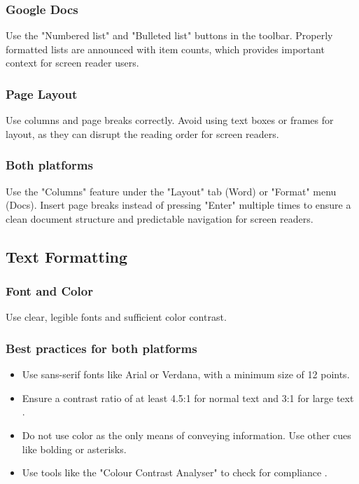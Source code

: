 \subsubsection{Google Docs}\label{ch15:sssec:docs-lists}
Use the "Numbered list" and "Bulleted list" buttons in the toolbar. Properly formatted lists are announced with item counts, which provides important context for screen reader users.

\subsubsection{Page Layout}\label{ch15:sssec:page-layout}
Use columns and page breaks correctly. Avoid using text boxes or frames for layout, as they can disrupt the reading order for screen readers.

\subsubsection{Both platforms}\label{ch15:sssec:layout-both}
Use the "Columns" feature under the "Layout" tab (Word) or "Format" menu (Docs). Insert page breaks instead of pressing "Enter" multiple times to ensure a clean document structure and predictable navigation for screen readers.

\subsection{Text Formatting}\label{ch15:ssec:text-formatting}

\subsubsection{Font and Color}\label{ch15:sssec:font-color}
Use clear, legible fonts and sufficient color contrast.

\subsubsection{Best practices for both platforms}\label{ch15:sssec:font-color-both}
\begin{itemize}
	\item Use sans-serif fonts like Arial or Verdana, with a minimum size of 12 points.
	\item Ensure a contrast ratio of at least 4.5:1 for normal text and 3:1 for large text \supercite{WCAG2018}.
	\item Do not use color as the only means of conveying information. Use other cues like bolding or asterisks.
	\item Use tools like the "Colour Contrast Analyser" to check for compliance \supercite{TGPiCCA}.
\end{itemize}

